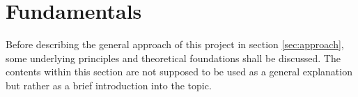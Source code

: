 \documentclass[a4paper,11pt]{article}%
\renewcommand{\\}{\vspace*{0.5\baselineskip} \newline}
\begin{document}
 

\section{Fundamentals}
\label{sec:fundamentals}
Before describing the general approach of this project in section \ref{sec:approach}, some underlying principles and theoretical foundations shall be discussed. The contents within this section are not supposed to be used as a general explanation but rather as a brief introduction into the topic.

\end{document}
